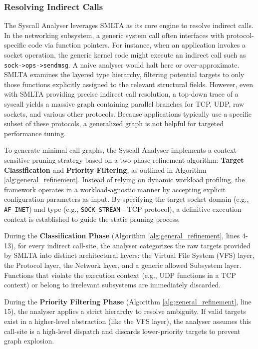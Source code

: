 \subsubsection{Resolving Indirect Calls}

The Syscall Analyser leverages SMLTA as its core engine to resolve indirect calls.
In the networking subsystem, a generic system call often interfaces with protocol-specific code via function pointers.
For instance, when an application invokes a socket operation, the generic kernel code might execute an indirect call such as \texttt{sock->ops->sendmsg}.
A naive analyser would halt here or over-approximate.
SMLTA examines the layered type hierarchy, filtering potential targets to only those functions explicitly assigned to the relevant structural fields.
However, even with SMLTA providing precise indirect call resolution, a top-down trace of a syscall yields a massive graph containing parallel branches for TCP, UDP, raw sockets, and various other protocols.
Because applications typically use a specific subset of these protocols, a generalized graph is not helpful for targeted performance tuning.

To generate minimal call graphs, the Syscall Analyser implements a context-sensitive pruning strategy based on a two-phase refinement algorithm: \textbf{Target Classification} and \textbf{Priority Filtering}, as outlined in Algorithm \ref{alg:general_refinement}.
Instead of relying on dynamic workload profiling, the framework operates in a workload-agnostic manner by accepting explicit configuration parameters as input.
By specifying the target socket domain (e.g., \texttt{AF\_INET}) and type (e.g., \texttt{SOCK\_STREAM} - TCP protocol), a definitive execution context is established to guide the static pruning process.

During the \textbf{Classification Phase} (Algorithm \ref{alg:general_refinement}, lines 4-13), for every indirect call-site, the analyser categorizes the raw targets provided by SMLTA into distinct architectural layers: the Virtual File System (VFS) layer, the Protocol layer, the Network layer, and a generic allowed Subsystem layer.
Functions that violate the execution context (e.g., UDP functions in a TCP context) or belong to irrelevant subsystems are immediately discarded.

During the \textbf{Priority Filtering Phase} (Algorithm \ref{alg:general_refinement}, line 15), the analyser applies a strict hierarchy to resolve ambiguity.
If valid targets exist in a higher-level abstraction (like the VFS layer), the analyser assumes this call-site is a high-level dispatch and discards lower-priority targets to prevent graph explosion.

